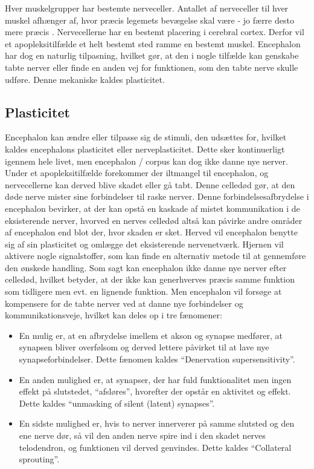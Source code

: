 Hver muskelgrupper har bestemte nerveceller. Antallet af nerveceller til hver muskel afhænger af, hvor præcis legemets bevægelse skal være - jo færre desto mere præcis \cite{Stanfield2014}. Nervecellerne har en bestemt placering i cerebral cortex. Derfor vil et apopleksitilfælde et helt bestemt sted ramme en bestemt muskel. Encephalon har dog en naturlig tilpasning, hvilket gør, at den i nogle tilfælde kan genskabe tabte nerver eller finde en anden vej for funktionen, som den tabte nerve skulle udføre. \cite{Martini2012} Denne mekaniske kaldes plasticitet. \cite{Ramanathan2006}

\subsection{Plasticitet}
Encephalon kan ændre eller tilpasse sig de stimuli, den udsættes for, hvilket kaldes encephalons plasticitet eller nerveplasticitet. Dette sker kontinuerligt igennem hele livet, men encephalon / corpus kan dog ikke danne nye nerver. \cite{Stanfield2014} Under et apopleksitilfælde forekommer der iltmangel til encephalon, og nervecellerne kan derved blive skadet eller gå tabt. \cite{Schulze2011} Denne celledød gør, at den døde nerve mister sine forbindelser til raske nerver. Denne forbindelsesafbrydelse i encephalon bevirker, at der kan opstå en kaskade af mistet kommunikation i de eksisterende nerver, hvorved en nerves celledød altså kan påvirke andre områder af encephalon end blot der, hvor skaden er sket. \cite{Raine2009} Herved vil encephalon benytte sig af sin plasticitet og omlægge det eksisterende nervenetværk. Hjernen vil aktivere nogle signalstoffer, som kan finde en alternativ metode til at gennemføre den ønskede handling. \cite{Rugnett2015}  Som sagt kan encephalon ikke danne nye nerver efter celledød, hvilket betyder, at der ikke kan generhverves præcis samme funktion som tidligere men evt. en lignende funktion. Men encephalon vil forsøge at kompensere for de tabte nerver ved at danne nye forbindelser og kommunikationsveje, hvilket kan deles op i tre fænomener: \cite{Raine2009}

\begin{itemize}
	\item En mulig er, at en afbrydelse imellem et akson og synapse medfører, at synapsen bliver overfølsom og derved lettere påvirket til at lave nye synapseforbindelser. Dette fænomen kaldes “Denervation supersensitivity”.
	\item En anden mulighed er, at synapser, der har fuld funktionalitet men ingen effekt på slutstedet, “afsløres”, hvorefter der opstår en aktivitet og effekt. Dette kaldes “unmasking of silent (latent) synapses”.
	\item En sidste mulighed er, hvis to nerver innerverer på samme slutsted og den ene nerve dør, så vil den anden nerve spire ind i den skadet nerves telodendron, og funktionen vil derved genvindes. Dette kaldes “Collateral sprouting”.
\end{itemize}

